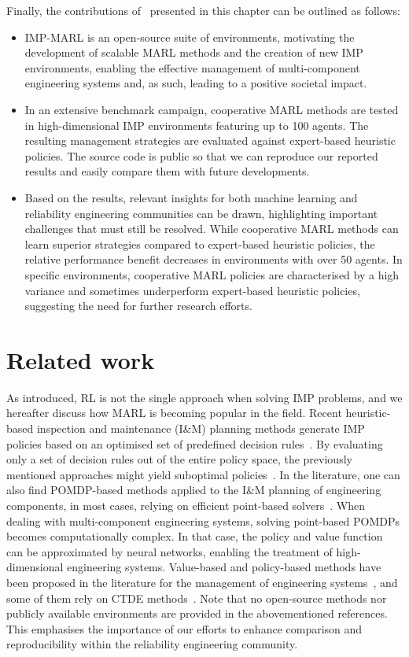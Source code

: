 Finally, the contributions of~\citep{leroy2023impmarl} presented in this chapter can be outlined as follows:
\begin{itemize}
  \item IMP-MARL is an open-source suite of environments, motivating the development of scalable MARL methods and the creation of new IMP environments, enabling the effective management of multi-component engineering systems and, as such, leading to a positive societal impact.
  \item In an extensive benchmark campaign, cooperative MARL methods are tested in high-dimensional IMP environments featuring up to 100 agents.
  The resulting management strategies are evaluated against expert-based heuristic policies.
  The source code is public so that we can reproduce our reported results and easily compare them with future developments.
  \item Based on the results, relevant insights for both machine learning and reliability engineering communities can be drawn, highlighting important challenges that must still be resolved.
  While cooperative MARL methods can learn superior strategies compared to expert-based heuristic policies, the relative performance benefit decreases in environments with over 50 agents.
  In specific environments, cooperative MARL policies are characterised by a high variance and sometimes underperform expert-based heuristic policies, suggesting the need for further research efforts.
\end{itemize}

\section{Related work} \label{sec:ch5_relatedwork}
As introduced, RL is not the single approach when solving IMP problems, and we hereafter discuss how MARL is becoming popular in the field.
Recent heuristic-based inspection and maintenance (I\&M) planning methods generate IMP policies based on an optimised set of predefined decision rules~\citep{LuqueDBN2019, Bismut2019OptimalDete}.
By evaluating only a set of decision rules out of the entire policy space, the previously mentioned approaches might yield suboptimal policies~\citep{morato2022optimal}.
In the literature, one can also find POMDP-based methods applied to the I\&M planning of engineering components, in most cases, relying on efficient point-based solvers~\citep{Papakonstantinou2014Part1, Papakonstantinou2014Part2, morato2022optimal}. 
When dealing with multi-component engineering systems, solving point-based POMDPs becomes computationally complex.
In that case, the policy and value function can be approximated by neural networks, enabling the treatment of high-dimensional engineering systems.
Value-based and policy-based methods have been proposed in the literature for the management of engineering systems~\citep{Andriotis2019ManagingLearning,andriotis2021deep,morato2022syst}, and some of them rely on CTDE methods~\citep{nguyen2022weighted, saifullah2022deep}.
Note that no open-source methods nor publicly available environments are provided in the abovementioned references.
This emphasises the importance of our efforts to enhance comparison and reproducibility within the reliability engineering community.

